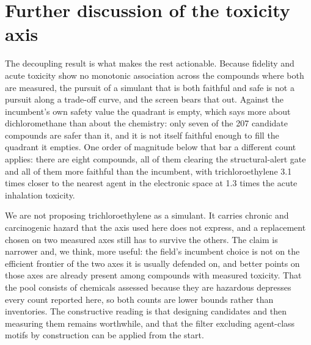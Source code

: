 \documentclass[journal=jacsat,manuscript=suppinfo,margin=1in]{achemso}
\begin{document}
\section{Further discussion of the toxicity axis}
\label{S-disc}

The decoupling result is what makes the rest actionable. Because fidelity and
acute toxicity show no monotonic association across the compounds where both are
measured, the
pursuit of a simulant that is both faithful and safe is not a pursuit along a
trade-off curve, and the screen bears that out. Against the incumbent's own
safety value the quadrant is empty, which says more about dichloromethane than
about the chemistry: only seven of the 207 candidate compounds are
safer than it, and it is not itself faithful enough to fill the quadrant it
empties. One order of magnitude below that bar a different count applies:
there are eight compounds, all of
them clearing the structural-alert gate and all of them more faithful than the
incumbent, with trichloroethylene 3.1 times closer to the nearest agent in the
electronic space at 1.3 times the acute inhalation toxicity.

We are not proposing trichloroethylene as a simulant. It carries chronic and
carcinogenic hazard that the axis used here does not express, and a replacement
chosen on two measured axes still has to survive the others. The claim is
narrower and, we think, more useful: the field's incumbent choice is not on the
efficient frontier of the two axes it is usually defended on, and better points
on those axes are already present among compounds with measured toxicity. That
the pool consists of chemicals assessed because they are hazardous depresses
every count reported here, so both counts are lower bounds rather than
inventories. The constructive reading is that designing candidates and then
measuring them remains worthwhile, and that the filter excluding agent-class
motifs by construction can be applied from the start.
\end{document}
